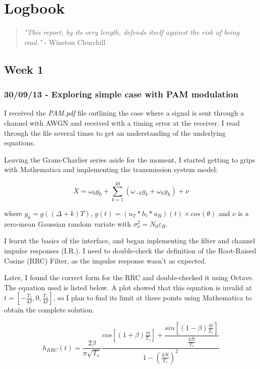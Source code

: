 \chapter{Logbook}

\begin{quote}
\textit{"This report, by its very length, defends itself against the risk of being read."} - Winston Churchill
\end{quote}

\section{Week 1}

\subsection{30/09/13 - Exploring simple case with PAM modulation}

I received the \emph{PAM.pdf} file outlining the case where a signal is
sent through a channel with AWGN and received with a timing error at the
receiver. I read through the file several times to get an understanding
of the underlying equations.

Leaving the Gram-Charlier series aside for the moment, I started getting
to grips with Mathematica and implementing the transmission system
model:

\[
X = \omega_0 g_0 + \sum_{k=1}^{40} ( \omega_{-k} g_{k} + \omega_k g_k ) + \nu
\]

where $g_k = g((\Delta + k)T)$,
$g(t) = (u_T \ast h_l \ast u_R)(t) \times cos(\theta)$ and $\nu$ is a
zero-mean Gaussian random variate with
$\sigma_{\nu}^2 = N_0 \varepsilon_R$.

I learnt the basics of the interface, and began inplementing the filter
and channel impulse responses (I.R.). I need to double-check the
definition of the Root-Raised Cosine (RRC) Filter, as the impulse
response wasn't as expected.

Later, I found the correct form for the RRC \cite{[12]} and double-checked it using Octave. The equation used is listed below. A plot showed that this equation is invalid at
$t = \left [ - \frac{T_s}{ 4 \beta } , 0 , \frac{T_s}{ 4 \beta } \right ]$,
so I plan to find its limit at these points using Mathematica to obtain
the complete solution.

\[
h_{RRC}(t) = \frac{2 \beta}{\pi \sqrt{T_s}} \frac{cos \left [ (1 + \beta) \frac{\pi t}{T_s} \right ] + \dfrac{sin \left [ (1 - \beta) \frac{\pi t}{T_s} \right ]}{\frac{4 \beta t}{T_s}}}{1 - \left ( \frac{4 \beta t}{T_s} \right )^2}
\]

